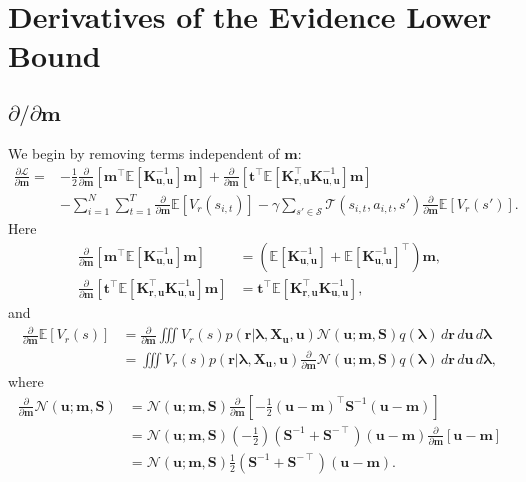 \documentclass{article}
\theoremstyle{definition}
\newcommand{\Kuu}{\mathbf{K}_{\mathbf{u},\mathbf{u}}}
\newcommand{\Kru}{\mathbf{K}_{\mathbf{r},\mathbf{u}}}
\newcommand{\dm}{\frac{\partial}{\partial\mathbf{m}}}
\begin{document}
\section{Derivatives of the Evidence Lower Bound}

\subsection{$\partial/\partial\mathbf{m}$}

We begin by removing terms independent of $\mathbf{m}$:
\[
  \begin{split}
    \frac{\partial\mathcal{L}}{\partial\mathbf{m}} =
    &- \frac{1}{2}\dm[\mathbf{m}^\intercal\mathbb{E}[\Kuu^{-1}]\mathbf{m}]
    + \dm[\mathbf{t}^\intercal\mathbb{E}[\Kru^\intercal\Kuu^{-1}]\mathbf{m}] \\
    &- \sum_{i=1}^N \sum_{t=1}^T \dm\mathbb{E}[V_r(s_{i,t})] -
      \gamma\sum_{s' \in \mathcal{S}} \mathcal{T}(s_{i,t}, a_{i,t},
      s')\dm\mathbb{E}[V_r(s')].
  \end{split}
\]
Here
\begin{align*}
  \dm[\mathbf{m}^\intercal\mathbb{E}[\Kuu^{-1}]\mathbf{m}] &= (\mathbb{E}[\Kuu^{-1}] + \mathbb{E}[\Kuu^{-1}]^\intercal)\mathbf{m}, \\
  \dm[\mathbf{t}^\intercal\mathbb{E}[\Kru^\intercal\Kuu^{-1}]\mathbf{m}] &= \mathbf{t}^\intercal\mathbb{E}[\Kru^\intercal\Kuu^{-1}],
\end{align*}
and
\begin{equation} \label{eq:1}
  \begin{split}
    \dm\mathbb{E}[V_r(s)] &= \dm\iiint V_r(s) p(\mathbf{r} | \bm\lambda,
    \mathbf{X_u}, \mathbf{u}) \mathcal{N}(\mathbf{u}; \mathbf{m}, \mathbf{S})
    q(\bm\lambda)\,d\mathbf{r}\,d\mathbf{u}\,d\bm\lambda \\
    &= \iiint V_r(s) p(\mathbf{r} | \bm\lambda,
    \mathbf{X_u}, \mathbf{u}) \dm\mathcal{N}(\mathbf{u}; \mathbf{m}, \mathbf{S})
    q(\bm\lambda)\,d\mathbf{r}\,d\mathbf{u}\,d\bm\lambda,
  \end{split}
\end{equation}
where
\[
  \begin{split}
    \dm\mathcal{N}(\mathbf{u}; \mathbf{m}, \mathbf{S}) &=
    \mathcal{N}(\mathbf{u}; \mathbf{m},
    \mathbf{S})\dm\left[-\frac{1}{2}(\mathbf{u} -
      \mathbf{m})^\intercal\mathbf{S}^{-1}(\mathbf{u} - \mathbf{m})\right] \\
    &= \mathcal{N}(\mathbf{u}; \mathbf{m},
    \mathbf{S})\left(-\frac{1}{2}\right)(\mathbf{S}^{-1} +
    \mathbf{S}^{-\intercal})(\mathbf{u} - \mathbf{m})\dm[\mathbf{u} -
    \mathbf{m}] \\
    &= \mathcal{N}(\mathbf{u}; \mathbf{m},
    \mathbf{S})\frac{1}{2}(\mathbf{S}^{-1} + \mathbf{S}^{-\intercal})(\mathbf{u}
    - \mathbf{m}).
  \end{split}
\]
\end{document}
